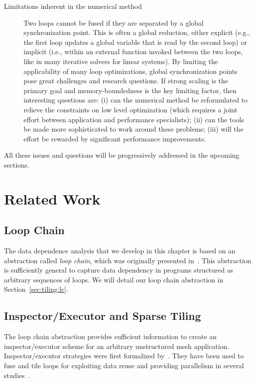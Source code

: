 \begin{description}
\item[Limitations inherent in the numerical method] Two loops cannot be fused if they are separated by a global synchronization point. This is often a global reduction, either explicit (e.g., the first loop updates a global variable that is read by the second loop) or implicit (i.e., within an external function invoked between the two loops, like in many iterative solvers for linear systems). By limiting the applicability of many loop optimizations, global synchronization points pose great challenges and research questions. If strong scaling is the primary goal and memory-boundedness is the key limiting factor, then interesting questions are: (i) can the numerical method be reformulated to relieve the constraints on low level optimization (which requires a joint effort between application and performance specialists); (ii) can the tools be made more sophisticated to work around these problems; (iii) will the effort be rewarded by significant performance improvements.
\end{description}

All these issues and questions will be progressively addressed in the upcoming sections.

\section{Related Work}
\label{sec:tiling:relatedwork}

\subsection*{Loop Chain}
The data dependence analysis that we develop in this chapter is based on an abstraction called \textit{loop chain}, which was originally presented in~\cite{ST-KriegerHIPS2013}. This abstraction is sufficiently general to capture data dependency in programs structured as arbitrary sequences of loops. We will detail our loop chain abstraction in Section~\ref{sec:tiling:lc}.

\subsection*{Inspector/Executor and Sparse Tiling}
The loop chain abstraction provides sufficient information to create an inspector/executor scheme for an arbitrary unstructured mesh application. Inspector/executor strategies were first formalized by~\cite{ST-Saltz91}. They have been used to fuse and tile loops for exploiting data reuse and providing parallelism in several studies~\citep{ST-dimeEtna00,ST-StroutLCPC2002,ST-Demmel08,ST-KriegerIAAA2012}. 


